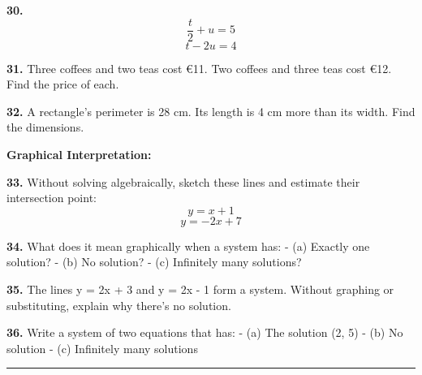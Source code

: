 \documentclass[
  11pt,
]{article}
\begin{document}
\textbf{30.} \[\frac{t}{2} + u = 5\] \[t - 2u = 4\]

\textbf{31.} Three coffees and two teas cost €11. Two coffees and three
teas cost €12. Find the price of each.

\textbf{32.} A rectangle's perimeter is 28 cm. Its length is 4 cm more
than its width. Find the dimensions.

\textbf{Graphical Interpretation:}

\textbf{33.} Without solving algebraically, sketch these lines and
estimate their intersection point: \[y = x + 1\] \[y = -2x + 7\]

\textbf{34.} What does it mean graphically when a system has: - (a)
Exactly one solution? - (b) No solution? - (c) Infinitely many
solutions?

\textbf{35.} The lines y = 2x + 3 and y = 2x - 1 form a system. Without
graphing or substituting, explain why there's no solution.

\textbf{36.} Write a system of two equations that has: - (a) The
solution (2, 5) - (b) No solution - (c) Infinitely many solutions

\begin{center}\rule{0.5\linewidth}{0.5pt}\end{center}
\end{document}
